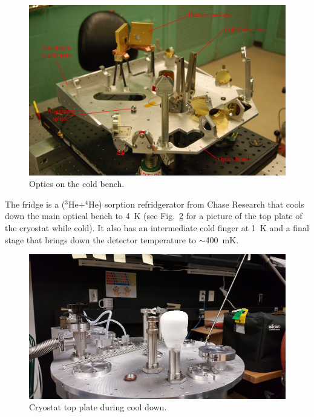 \begin{figure}[!h]
		\centering
		\includegraphics[width=\textwidth]{Figures/ColdBench-anottated.jpg} 
		\caption[Cold bench]{Optics on the cold bench.}
		\label{fig:ColdBench}
\end{figure}







The fridge is a ($^3$He+$^4$He) sorption refridgerator from Chase Research that cools down the main optical bench to \SI{4}{\kelvin} (see Fig.~\ref{fig:CryostatTopPlate} for a picture of the top plate of the cryostat while cold). It also has an intermediate cold finger at \SI{1}{\kelvin} and a final stage that brings down the detector temperature to $\sim$\SI{400}{\milli\kelvin}. 

\begin{figure}[!h]
		\centering
		\includegraphics[width=\textwidth]{Figures/Cryostat.jpg} 
		\caption[Cryostat top plate]{Cryostat top plate during cool down.}
		\label{fig:CryostatTopPlate}
\end{figure}


